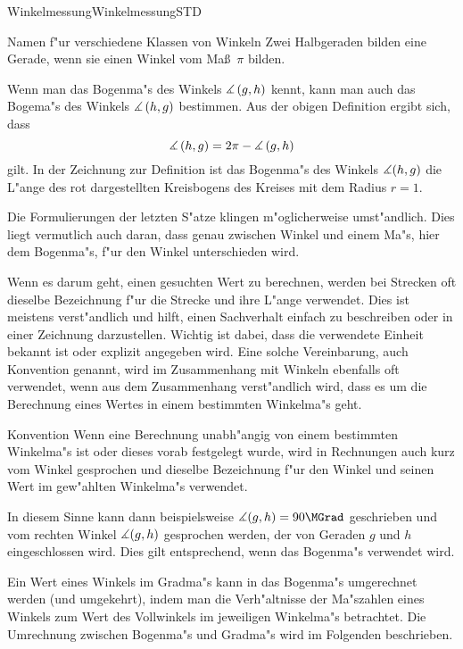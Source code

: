\begin{MXContent}{Winkelmessung}{Winkelmessung}{STD}
\begin{MXInfo}{Namen f"ur verschiedene Klassen von Winkeln}
Zwei Halbgeraden bilden eine Gerade, wenn sie einen Winkel vom Ma\ss~$\pi$ bilden.
\end{MXInfo}

Wenn man das Bogenma"s des Winkels $\measuredangle \left( g, h \right)$ kennt, 
kann man auch das Bogema"s des Winkels $\measuredangle \left( h, g \right)$ 
bestimmen. Aus der obigen Definition  ergibt sich, 
dass 
\[
   \Mmeasuredangle \left( h, g \right)
 = 2 \pi - \Mmeasuredangle \left( g, h \right) %
\]
gilt. In der Zeichnung zur Definition  ist das 
Bogenma"s des Winkels $\measuredangle(h,g)$ die L"ange des rot dargestellten 
Kreisbogens des Kreises mit dem Radius $r = 1$.

Die Formulierungen der letzten S"atze klingen m"oglicherweise umst"andlich.
Dies liegt vermutlich auch daran, dass genau zwischen Winkel und einem Ma"s, 
hier dem Bogenma"s, f"ur den Winkel unterschieden wird.

Wenn es darum geht, einen gesuchten Wert zu berechnen, werden bei Strecken 
oft dieselbe Bezeichnung f"ur die Strecke und ihre L"ange verwendet. Dies 
ist meistens verst"andlich und hilft, einen Sachverhalt einfach zu beschreiben
oder in einer Zeichnung darzustellen. Wichtig ist dabei, dass die verwendete 
Einheit bekannt ist oder explizit angegeben wird.
Eine solche Vereinbarung, auch Konvention genannt, wird im Zusammenhang mit 
Winkeln ebenfalls oft verwendet, wenn aus dem Zusammenhang verst"andlich wird,
dass es um die Berechnung eines Wertes in einem bestimmten Winkelma"s geht.

\begin{MXInfo}{Konvention}%
Wenn eine Berechnung unabh"angig von einem bestimmten Winkelma"s ist oder 
dieses vorab festgelegt wurde, wird in Rechnungen auch kurz vom Winkel 
gesprochen und dieselbe Bezeichnung f"ur den Winkel und seinen Wert im 
gew"ahlten Winkelma"s verwendet.
\end{MXInfo}
In diesem Sinne kann dann beispielsweise $\Mmeasuredangle(g,h) = 90\MGrad$ 
geschrieben und vom rechten Winkel $\measuredangle(g,h)$ gesprochen werden, 
der von Geraden $g$ und $h$ eingeschlossen wird.
Dies gilt entsprechend, wenn das Bogenma"s verwendet wird.

Ein Wert eines Winkels im Gradma"s kann in das Bogenma"s umgerechnet werden 
(und umgekehrt), indem man die Verh"altnisse der Ma"szahlen eines Winkels zum 
Wert des Vollwinkels im jeweiligen Winkelma"s betrachtet. Die Umrechnung 
zwischen Bogenma"s und Gradma"s wird im Folgenden beschrieben.


\end{MXContent}

